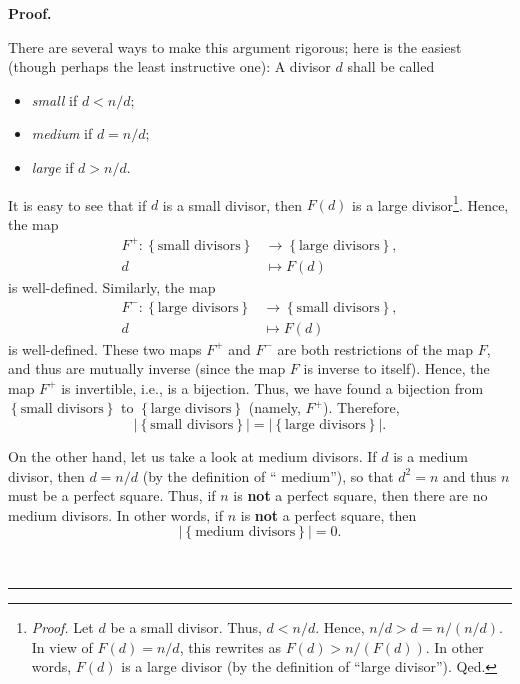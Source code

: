 \documentclass[numbers=enddot,12pt,final,onecolumn,notitlepage]{scrartcl}%
\numberwithin{exer}{subsection}
\theoremstyle{definition}
\newenvironment{fineprint}{\begin{small}}{\end{small}}
\newenvironment{proof}[1][Proof]{\noindent\textbf{#1.} }{\ \rule{0.5em}{0.5em}}
\begin{document}
\begin{proof}
\begin{fineprint}
There are several ways to make this argument rigorous; here is the easiest
(though perhaps the least instructive one): A divisor $d$ shall be called

\begin{itemize}
\item \textit{small} if $d<n/d$;

\item \textit{medium} if $d=n/d$;

\item \textit{large} if $d>n/d$.
\end{itemize}

It is easy to see that if $d$ is a small divisor, then $F\left(  d\right)  $
is a large divisor\footnote{\textit{Proof.} Let $d$ be a small divisor. Thus,
$d<n/d$. Hence, $n/d>d=n/\left(  n/d\right)  $. In view of $F\left(  d\right)
=n/d$, this rewrites as $F\left(  d\right)  >n/\left(  F\left(  d\right)
\right)  $. In other words, $F\left(  d\right)  $ is a large divisor (by the
definition of \textquotedblleft large divisor\textquotedblright). Qed.}.
Hence, the map%
\begin{align*}
F^{+}:\left\{  \text{small divisors}\right\}   &  \rightarrow\left\{
\text{large divisors}\right\}  ,\\
d  &  \mapsto F\left(  d\right)
\end{align*}
is well-defined. Similarly, the map%
\begin{align*}
F^{-}:\left\{  \text{large divisors}\right\}   &  \rightarrow\left\{
\text{small divisors}\right\}  ,\\
d  &  \mapsto F\left(  d\right)
\end{align*}
is well-defined. These two maps $F^{+}$ and $F^{-}$ are both restrictions of
the map $F$, and thus are mutually inverse (since the map $F$ is inverse to
itself). Hence, the map $F^{+}$ is invertible, i.e., is a bijection. Thus, we
have found a bijection from $\left\{  \text{small divisors}\right\}  $ to
$\left\{  \text{large divisors}\right\}  $ (namely, $F^{+}$). Therefore,%
\begin{equation}
\left\vert \left\{  \text{small divisors}\right\}  \right\vert =\left\vert
\left\{  \text{large divisors}\right\}  \right\vert .
\label{pf.prop.ent.phi.ghosts.s=l}%
\end{equation}


On the other hand, let us take a look at medium divisors. If $d$ is a medium
divisor, then $d=n/d$ (by the definition of \textquotedblleft
medium\textquotedblright), so that $d^{2}=n$ and thus $n$ must be a perfect
square. Thus, if $n$ is \textbf{not} a perfect square, then there are no
medium divisors. In other words, if $n$ is \textbf{not} a perfect square, then%
\begin{equation}
\left\vert \left\{  \text{medium divisors}\right\}  \right\vert =0.
\label{pf.prop.ent.phi.ghosts.m0}%
\end{equation}



\end{fineprint}
\end{proof}
\end{document}
